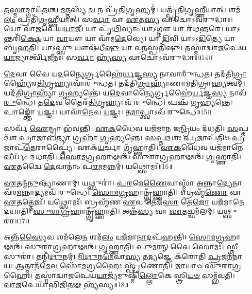 𑌤\-\ul{𑌸𑍍𑌮𑌾}\-𑌦𑍍𑌗𑌾𑌯᳴𑌤𑌶𑍍𑌚 \ul{𑌮}\-𑌤𑍍𑌤𑌸𑍍𑌯᳴ \ul{𑌚} 𑌨 𑌪𑍍𑌰᳴\-\ul{𑌤𑌿}\-𑌗𑍃𑌹𑍍𑌯𑌮𑍍॑।
𑌯𑌤𑍍𑌪𑍍𑌰᳴𑌤𑌿𑌗𑍃\-\ul{𑌹𑍍𑌣𑍀}\-𑌯𑌾𑌤𑍍।
𑌶𑌮᳴\-\ul{𑌲𑌂} 𑌪𑍍𑌰𑌤𑌿᳴\-𑌗𑍃𑌹𑍍𑌣𑍀𑌯𑌾𑌤𑍍।
𑌸\-\ul{𑌰𑍍𑌵𑌾} 𑌵𑌾 \ul{𑌏}\-𑌤\-\ul{𑌸𑍍𑌯} 𑌵𑌾𑌚𑍋\-𑌽𑌵᳴𑌰𑍁𑌦𑍍𑌧𑌾𑌃।
𑌯𑍋 𑌵𑌾᳴𑌜𑌪𑍇𑌯\-\ul{𑌯𑌾}\-𑌜𑍀।
𑌯𑌾 𑌪𑍃᳴\-\ul{𑌥𑌿}\-𑌵𑍍𑌯𑌾𑌂 𑌯𑌾𑌽𑌗𑍍𑌨𑍗 𑌯𑌾 𑌰᳴𑌥\-\ul{𑌨𑍍𑌤}\-𑌰𑍇।
𑌯𑌾𑌽𑌨𑍍𑌤𑌰𑌿᳴\-\ul{𑌕𑍍𑌷𑍇} 𑌯𑌾 \ul{𑌵𑌾}\-𑌯𑍗 𑌯𑌾 𑌵𑌾᳴𑌮\-\ul{𑌦𑍇}\-𑌵𑍍𑌯𑍇।
𑌯𑌾 \ul{𑌦𑌿}\-𑌵𑌿 𑌯𑌾𑌽𑌽\-\ul{𑌦𑌿}\-𑌤𑍍𑌯𑍇 𑌯𑌾 𑌬𑍃᳴\-\ul{𑌹}\-𑌤𑌿।
𑌯𑌾𑌽𑌫𑍍𑌸𑍁 𑌯𑍗𑌷᳴𑌧𑍀\-\ul{𑌷𑍁} 𑌯𑌾 𑌵\-\ul{𑌨}\-𑌸𑍍𑌪𑌤𑌿᳴𑌷𑍁।
𑌤𑌸𑍍𑌮𑌾॑𑌦𑍍𑌵𑌾𑌜𑌪𑍇𑌯\-\ul{𑌯𑌾}\-𑌜𑍍𑌯𑌾𑌰𑍍𑌤𑍍𑌵𑌿᳴𑌜𑍀𑌨𑌃।
𑌸\-\ul{𑌰𑍍𑌵𑌾} 𑌹𑍍𑌯᳴\-\ul{𑌸𑍍𑌯} 𑌵𑌾𑌚𑍋\-𑌽𑌵᳴𑌰𑍁𑌦𑍍𑌧𑌾𑌃॥14॥\anuvakamend[\-\ul{𑌧𑌾}\-\-\ul{𑌵𑌾}\-𑌮𑍇\-\ul{𑌤𑌿} 𑌜𑍍𑌯𑍈𑌷𑍍𑌠𑍍𑌯𑌾᳴\-\ul{𑌯} 𑌵𑍇𑌦᳴ \ul{𑌬𑍍𑌰}\-𑌹𑍍𑌮𑌾 𑌜𑌾᳴𑌯𑌤𑍇 𑌵𑌾\-\ul{𑌜}\-𑌪𑍇\-\ul{𑌯𑌃} 𑌸𑍁𑌰𑌾\-𑌽𑌽𑌰𑍍𑌤𑍍𑌵𑌿᳴𑌜𑍀\-\ul{𑌨} 𑌏𑌕𑌂᳴ 𑌚]

\-\ul{𑌦𑍇}\-𑌵𑌾 𑌵𑍈 𑌯\-\ul{𑌦}\-𑌨𑍍𑌯𑍈𑌰𑍍𑌗𑍍𑌰𑌹𑍈॑\-\ul{𑌰𑍍𑌯}\-𑌜𑍍𑌞\-\ul{𑌸𑍍𑌯} 𑌨𑌾𑌵𑌾𑌰𑍁᳴𑌨𑍍𑌧𑌤।
𑌤𑌦᳴𑌤𑌿\-\ul{𑌗𑍍𑌰𑌾}\-𑌹𑍍𑌯𑍈᳴𑌰\-\ul{𑌤𑌿}\-\-𑌗𑍃𑌹𑍍𑌯𑌾\-𑌵𑌾᳴𑌰𑍁𑌨𑍍𑌧𑌤।
𑌤𑌦᳴𑌤𑌿\-\ul{𑌗𑍍𑌰𑌾}\-𑌹𑍍𑌯𑌾᳴𑌣𑌾𑌮𑌤𑌿𑌗𑍍𑌰𑌾\-\ul{𑌹𑍍𑌯}\-𑌤𑍍𑌵𑌮𑍍।
𑌯𑌦᳴𑌤𑌿\-\ul{𑌗𑍍𑌰𑌾}\-𑌹𑍍𑌯𑌾᳴ \ul{𑌗𑍃}\-𑌹𑍍𑌯𑌨𑍍𑌤𑍇॑।
𑌯\-\ul{𑌦𑍇}\-𑌵𑌾𑌨𑍍𑌯𑍈𑌰𑍍𑌗𑍍𑌰𑌹𑍈॑\-\ul{𑌰𑍍𑌯}\-𑌜𑍍𑌞\-\ul{𑌸𑍍𑌯} 𑌨𑌾𑌵᳴ \ul{𑌰𑍁}\-𑌨𑍍𑌧𑍇।
𑌤\-\ul{𑌦𑍇}\-𑌵 𑌤𑍈𑌰᳴\-\ul{𑌤𑌿}\-𑌗𑍃𑌹𑍍𑌯𑌾\-𑌵᳴ 𑌰𑍁𑌨𑍍𑌧𑍇।
𑌪𑌞𑍍𑌚᳴ 𑌗𑍃𑌹𑍍𑌯𑌨𑍍𑌤𑍇।
𑌪𑌾𑌙𑍍𑌕𑍍𑌤𑍋᳴ \ul{𑌯}\-𑌜𑍍𑌞𑌃।
𑌯𑌾𑌵𑌾᳴\-\ul{𑌨𑍇}\-𑌵 \ul{𑌯}\-𑌜𑍍𑌞𑌃।
𑌤\-\ul{𑌮𑌾}\-𑌪𑍍𑌤𑍍𑌵𑌾\-𑌽𑌵᳴ 𑌰𑍁𑌨𑍍𑌧𑍇॥15॥

𑌸𑌰𑍍𑌵᳴ \ul{𑌐}\-𑌨𑍍𑌦𑍍𑌰𑌾 𑌭᳴𑌵𑌨𑍍𑌤𑌿।
\-\ul{𑌏}\-\-\ul{𑌕}\-𑌧𑍈𑌵 𑌯𑌜᳴𑌮𑌾𑌨 𑌇\-\ul{𑌨𑍍𑌦𑍍𑌰𑌿}\-𑌯𑌂 𑌦᳴𑌧𑌤𑌿।
\-\ul{𑌸}\-𑌪𑍍𑌤𑌦᳴𑌶 𑌪𑍍𑌰𑌾𑌜𑌾\-\ul{𑌪}\-𑌤𑍍𑌯𑌾 𑌗𑍍𑌰𑌹𑌾᳴ 𑌗𑍃𑌹𑍍𑌯𑌨𑍍𑌤𑍇।
\-\ul{𑌸}\-\-\ul{𑌪𑍍𑌤}\-\-\ul{𑌦}\-𑌶𑌃 \ul{𑌪𑍍𑌰}\-𑌜𑌾\-𑌪᳴𑌤𑌿𑌃।
\-\ul{𑌪𑍍𑌰}\-𑌜𑌾𑌪᳴\-\ul{𑌤𑍇}\-𑌰𑌾𑌪𑍍𑌤𑍍𑌯𑍈॑।
𑌏𑌕᳴\-\ul{𑌯}\-𑌰𑍍𑌚𑌾 𑌗𑍃᳴𑌹𑍍𑌣𑌾𑌤𑌿।
\-\ul{𑌏}\-\-\ul{𑌕}\-𑌧𑍈𑌵 𑌯𑌜᳴𑌮𑌾𑌨𑍇 \ul{𑌵𑍀}\-𑌰𑍍𑌯𑌂᳴ 𑌦𑌧𑌾𑌤𑌿।
\-\ul{𑌸𑍋}\-\-\ul{𑌮}\-\-\ul{𑌗𑍍𑌰}\-𑌹𑌾𑍟𑌶𑍍𑌚᳴ 𑌸𑍁𑌰𑌾\-\ul{𑌗𑍍𑌰}\-𑌹𑌾𑍟𑌶𑍍𑌚᳴ 𑌗𑍃𑌹𑍍𑌣𑌾𑌤𑌿।
\-\ul{𑌏}\-𑌤𑌦𑍍𑌵𑍈 \ul{𑌦𑍇}\-𑌵𑌾𑌨𑌾𑌂॑ 𑌪\-\ul{𑌰}\-𑌮𑌮𑌨𑍍𑌨𑌮𑍍॑।
𑌯𑌥𑍍𑌸𑍋𑌮𑌃᳴॥16॥

\-\ul{𑌏}\-𑌤𑌨𑍍𑌮᳴\-\ul{𑌨𑍁}\-𑌷𑍍𑌯𑌾᳴𑌣𑌾𑌮𑍍।
𑌯𑌥𑍍𑌸𑍁𑌰𑌾॑।
\-\ul{𑌪}\-\-\ul{𑌰}\-𑌮𑍇\-\ul{𑌣𑍈}\-𑌵𑌾𑌸𑍍𑌮𑌾᳴ \ul{𑌅}\-𑌨𑍍𑌨𑌾\-\ul{𑌦𑍍𑌯𑍇}\-𑌨𑌾𑌵᳴𑌰\-\-\ul{𑌮}\-𑌨𑍍𑌨𑌾\-\ul{𑌦𑍍𑌯}\-𑌮𑌵᳴ 𑌰𑍁𑌨𑍍𑌧𑍇।
\-\ul{𑌸𑍋}\-\-\ul{𑌮}\-\-\ul{𑌗𑍍𑌰}\-𑌹𑌾𑌨𑍍𑌗𑍃᳴𑌹𑍍𑌣𑌾𑌤𑌿।
𑌬𑍍𑌰𑌹𑍍𑌮᳴\-\ul{𑌣𑍋} 𑌵𑌾 \ul{𑌏}\-𑌤𑌤𑍍𑌤𑍇𑌜𑌃᳴।
𑌯𑌥𑍍𑌸𑍋𑌮𑌃᳴।
𑌬𑍍𑌰𑌹𑍍𑌮᳴𑌣 \ul{𑌏}\-𑌵 𑌤𑍇𑌜᳴\-\ul{𑌸𑌾} 𑌤𑍇\-\ul{𑌜𑍋} 𑌯𑌜᳴𑌮𑌾𑌨𑍇 𑌦𑌧𑌾𑌤𑌿।
\-\ul{𑌸𑍁}\-\-\ul{𑌰𑌾}\-\-\ul{𑌗𑍍𑌰}\-𑌹𑌾𑌨𑍍𑌗𑍃᳴𑌹𑍍𑌣𑌾𑌤𑌿।
𑌅𑌨𑍍𑌨᳴\-\ul{𑌸𑍍𑌯} 𑌵𑌾 \ul{𑌏}\-𑌤𑌚𑍍𑌛𑌮᳴𑌲𑌮𑍍।
𑌯𑌥𑍍𑌸𑍁𑌰𑌾॑॥17॥

𑌅𑌨𑍍𑌨᳴\-\ul{𑌸𑍍𑌯𑍈}\-𑌵 𑌶𑌮᳴𑌲𑍇\-\ul{𑌨} 𑌶𑌮᳴\-\ul{𑌲𑌂} 𑌯𑌜᳴𑌮𑌾\-\ul{𑌨𑌾}\-𑌦𑌪᳴𑌹𑌨𑍍𑌤𑌿।
\-\ul{𑌸𑍋}\-\-\ul{𑌮}\-\-\ul{𑌗𑍍𑌰}\-𑌹𑌾𑍟𑌶𑍍𑌚᳴ 𑌸𑍁𑌰𑌾\-\ul{𑌗𑍍𑌰}\-𑌹𑌾𑍟𑌶𑍍𑌚᳴ 𑌗𑍃𑌹𑍍𑌣𑌾𑌤𑌿।
𑌪𑍁\-\ul{𑌮𑌾}\-\-\ul{𑌨𑍍} 𑌵𑍈 𑌸𑍋𑌮𑌃᳴।
𑌸𑍍𑌤𑍍𑌰𑍀 𑌸𑍁𑌰𑌾॑।
𑌤𑌨𑍍𑌮𑌿᳴\-\ul{𑌥𑍁}\-𑌨𑌮𑍍।
\-\ul{𑌮𑌿}\-\-\ul{𑌥𑍁}\-𑌨\-\ul{𑌮𑍇}\-𑌵𑌾\-\ul{𑌸𑍍𑌯} 𑌤\-\ul{𑌦𑍍𑌯}\-𑌜𑍍𑌞𑍇 𑌕᳴𑌰𑍋𑌤𑌿 \ul{𑌪𑍍𑌰}\-𑌜𑌨᳴𑌨𑌾𑌯।
\-\ul{𑌆}\-𑌤𑍍𑌮𑌾𑌨᳴\-\ul{𑌮𑍇}\-𑌵 𑌸𑍋᳴𑌮\-\ul{𑌗𑍍𑌰}\-𑌹𑍈𑌃 𑌸𑍍𑌪𑍃᳴𑌣𑍋𑌤𑌿।
\-\ul{𑌜𑌾}\-𑌯𑌾𑍞 𑌸𑍁᳴𑌰𑌾\-\ul{𑌗𑍍𑌰}\-𑌹𑍈𑌃।
𑌤𑌸𑍍𑌮𑌾॑𑌦𑍍𑌵𑌾𑌜𑌪𑍇𑌯\-\ul{𑌯𑌾}\-𑌜𑍍𑌯᳴𑌮𑍁𑌷𑍍𑌮𑌿𑌁᳴\-\ul{𑌲𑍍𑌲𑍋}\-𑌕𑍇 𑌸𑍍𑌤𑍍𑌰𑌿\-\ul{𑌯}\-\-\ul{𑍞} 𑌸𑌮𑍍𑌭᳴𑌵𑌤𑌿।
\-\ul{𑌵𑌾}\-\-\ul{𑌜}\-𑌪𑍇𑌯𑌾᳴𑌭𑌿𑌜𑌿\-\ul{𑌤}\-\-\ul{𑍟} 𑌹𑍍𑌯᳴𑌸𑍍𑌯॥18॥

